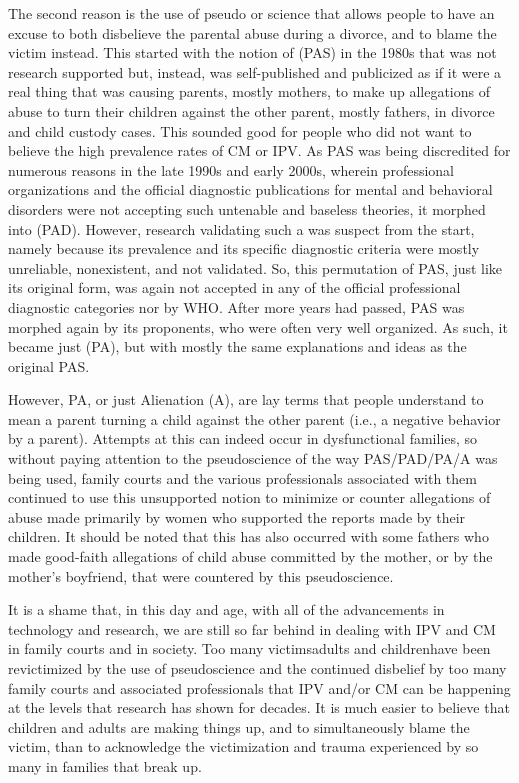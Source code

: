 The second reason is the use of pseudo or  science that allows
people to have an excuse to both disbelieve the parental abuse during
a divorce, and to blame the victim instead. This started with the notion
of  (PAS) in the 1980s 
that was not research supported but, instead, was self-published and publicized as if
it were a real thing that was causing parents, mostly mothers, to make
up allegations of abuse to turn their children against the other parent,
mostly fathers, in divorce and child custody cases. This sounded good
for people who did not want to believe the high prevalence rates of CM
or IPV. As PAS was being discredited for numerous reasons in the late
1990s and early 2000s, wherein professional organizations and the official
diagnostic publications for mental and behavioral disorders were not accepting such untenable and baseless theories, it morphed into  (PAD).
However, research validating such a  was 
suspect from the start, namely because its prevalence and
its specific diagnostic criteria were mostly unreliable, nonexistent, and
not validated. So, this permutation of PAS, just like its original form,
was again not accepted in any of the official professional diagnostic
categories nor by WHO. After more years had passed, PAS was morphed again by its proponents, who were often very well organized. As
such, it became just  (PA), but with mostly the same
explanations and ideas as the original PAS. \pfl{}

However, PA, or just Alienation (A), are lay terms that people understand to mean a parent turning a child against the other parent (i.e.,
a negative behavior by a parent). Attempts at this can indeed occur
in dysfunctional families, so without paying attention to the pseudoscience of the way PAS/PAD/PA/A was being used, family courts and
the various professionals associated with them continued to use this
unsupported notion to minimize or counter allegations of abuse made
primarily by women who supported the reports made by their children.
It should be noted that this has also occurred with some fathers who
made good-faith allegations of child abuse committed by the mother, or
by the mother's boyfriend, that were countered by this pseudoscience. \pfl{}

It is a shame that, in this day and age, with all of the advancements
in technology and research, we are still so far behind in dealing with
IPV and CM in family courts and in society. Too many victims\mdash{}adults
and children\mdash{}have been revictimized by the use of pseudoscience and
the continued disbelief by too many family courts 
and associated professionals that IPV and/or CM can be happening at the levels that research
has shown for decades. It is much easier to believe that children and
adults are making things up, and to simultaneously blame the victim,
than to acknowledge the victimization and trauma experienced by so
many in families that break up. \pfl{}

